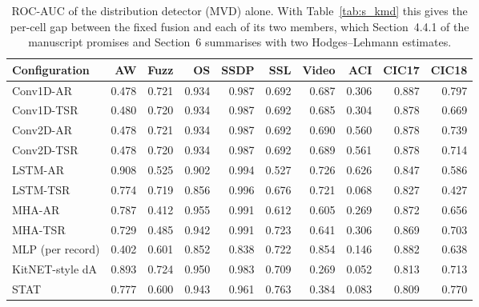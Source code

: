 \begin{table}[ht]\centering\footnotesize\setlength{\tabcolsep}{3.5pt}
\begin{tabular}{lrrrrrrrrr}
\hline
\textbf{Configuration} & \textbf{AW} & \textbf{Fuzz} & \textbf{OS} & \textbf{SSDP} & \textbf{SSL} & \textbf{Video} & \textbf{ACI} & \textbf{CIC17} & \textbf{CIC18}\\
\hline
Conv1D-AR & 0.478 & 0.721 & 0.934 & 0.987 & 0.692 & 0.687 & 0.306 & 0.887 & 0.797\\
Conv1D-TSR & 0.480 & 0.720 & 0.934 & 0.987 & 0.692 & 0.685 & 0.304 & 0.878 & 0.669\\
Conv2D-AR & 0.478 & 0.721 & 0.934 & 0.987 & 0.692 & 0.690 & 0.560 & 0.878 & 0.739\\
Conv2D-TSR & 0.478 & 0.720 & 0.934 & 0.987 & 0.692 & 0.689 & 0.561 & 0.878 & 0.714\\
LSTM-AR & 0.908 & 0.525 & 0.902 & 0.994 & 0.527 & 0.726 & 0.626 & 0.847 & 0.586\\
LSTM-TSR & 0.774 & 0.719 & 0.856 & 0.996 & 0.676 & 0.721 & 0.068 & 0.827 & 0.427\\
MHA-AR & 0.787 & 0.412 & 0.955 & 0.991 & 0.612 & 0.605 & 0.269 & 0.872 & 0.656\\
MHA-TSR & 0.729 & 0.485 & 0.942 & 0.991 & 0.723 & 0.641 & 0.306 & 0.869 & 0.703\\
MLP (per record) & 0.402 & 0.601 & 0.852 & 0.838 & 0.722 & 0.854 & 0.146 & 0.882 & 0.638\\
KitNET-style dA & 0.893 & 0.724 & 0.950 & 0.983 & 0.709 & 0.269 & 0.052 & 0.813 & 0.713\\
STAT & 0.777 & 0.600 & 0.943 & 0.961 & 0.763 & 0.384 & 0.083 & 0.809 & 0.770\\
\hline
\end{tabular}
\caption{ROC-AUC of the distribution detector (MVD) alone. With Table~\ref{tab:s_kmd} this gives the per-cell gap between the fixed fusion and each of its two members, which Section~4.4.1 of the manuscript promises and Section~6 summarises with two Hodges--Lehmann estimates.}\label{tab:s_mvd}
\end{table}

